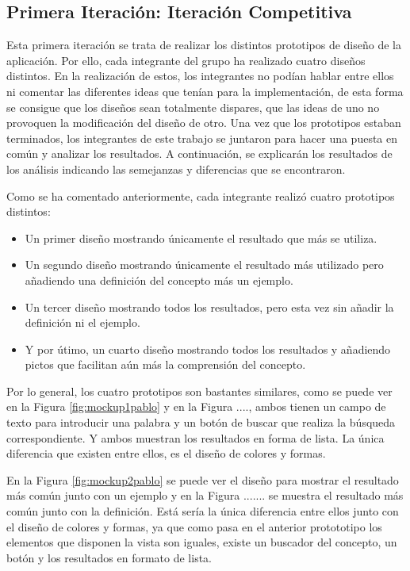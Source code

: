 \subsection{Primera Iteración: Iteración Competitiva}
\label{cap:subsec:iteracionCompetitiva}

Esta primera iteración se trata de realizar los distintos prototipos de diseño de la aplicación. Por ello, cada integrante del grupo ha realizado cuatro diseños distintos. En la realización de estos, los integrantes no podían hablar entre ellos ni comentar las diferentes ideas que tenían para la  implementación, de esta forma se consigue que los diseños sean totalmente dispares, que las ideas de uno no provoquen la modificación del diseño de otro.
Una vez que los prototipos estaban terminados, los integrantes de este trabajo se juntaron para hacer una puesta en común y analizar los resultados. A continuación, se explicarán los resultados de los análisis indicando las semejanzas y diferencias que se encontraron.

Como se ha comentado anteriormente, cada integrante realizó cuatro prototipos distintos:
\begin{itemize}
	\item Un primer diseño mostrando únicamente el resultado que más se utiliza.
	\item Un segundo diseño mostrando únicamente el resultado más utilizado pero añadiendo una definición del concepto más un ejemplo.
	\item Un tercer diseño mostrando todos los resultados, pero esta vez sin añadir la definición ni el ejemplo.
	\item Y por útimo, un cuarto diseño mostrando todos los resultados y añadiendo pictos que facilitan aún más la comprensión del concepto.
	
\end{itemize}

Por lo general, los cuatro prototipos son bastantes similares, como se puede ver en la Figura \ref{fig:mockup1pablo} y en la Figura ...., ambos tienen un campo de texto para introducir una palabra y un botón de buscar que realiza la búsqueda correspondiente. Y ambos muestran los resultados en forma de lista. La única diferencia que existen entre ellos, es el diseño de colores y formas.

En la Figura \ref{fig:mockup2pablo} se puede ver el diseño para mostrar el resultado más común junto con un ejemplo y en la Figura ....... se muestra el resultado más común junto con la definición. Está sería la única diferencia entre ellos junto con el diseño de colores y formas, ya que como pasa en el anterior protototipo los elementos que disponen la vista son iguales, existe un buscador del concepto, un botón y los resultados en formato de lista.


